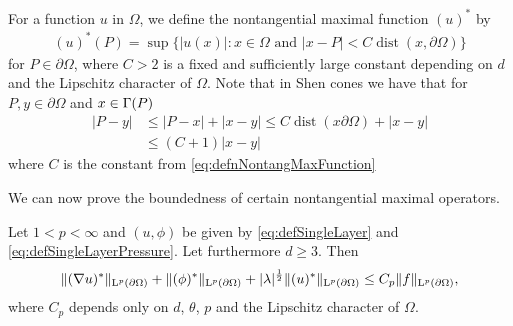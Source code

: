 For a function $u$ in $\Omega$, we define the nontangential maximal function $(u)^*$ by
\begin{align}
  \label{eq:defnNontangMaxFunction}
  (u)^*(P) = \sup\{ |u(x)| \colon x \in \Omega \text{ and } |x - P| < C \operatorname{dist}(x, \partial\Omega)\}
\end{align}
for $P \in \partial\Omega$, where $C > 2$ is a fixed and sufficiently large constant depending on $d$ and the Lipschitz character of $\Omega$.
Note that in Shen cones we have that for $P, y \in \partial\Omega$ and $x \in \Gamma(P)$
\begin{align}
  \label{eq:shenConeEstimate}
  |P - y| 
  &\leq |P - x| + |x - y| 
  \leq C \operatorname{dist}(x \partial\Omega) + |x - y|  \nonumber\\
  &\leq (C + 1) |x - y|
\end{align}
where $C$ is the constant from \eqref{eq:defnNontangMaxFunction}

We can now prove the boundedness of certain nontangential maximal operators.
\begin{lem}
  \label{lem:nontangentialMaximalFunctions}
  Let $1 < p < \infty$ and $(u,\phi)$ be given by \eqref{eq:defSingleLayer} and \eqref{eq:defSingleLayerPressure}.
  Let furthermore $d \geq 3$.
  Then 
  \begin{align}
    \| (\nabla u)^* \|_{\mathrm{L}^p(\partial\Omega)} + \| (\phi)^* \|_{\mathrm{L}^p(\partial\Omega)} + |\lambda|^{\frac{1}{2}} \|(u)^*\|_{\mathrm{L}^p(\partial\Omega)} \leq C_p \|f\|_{\mathrm{L}^p(\partial\Omega)},
  \end{align}
  where $C_p$ depends only on $d$, $\theta$, $p$ and the Lipschitz character of $\Omega$.
\end{lem}

